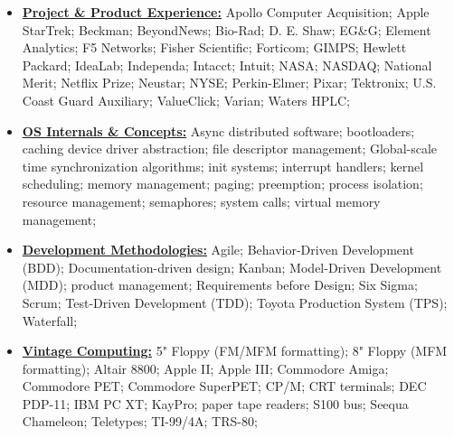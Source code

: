 \documentclass[letterpaper,11pt]{article}
\begin{document}
\begin{multicols}{3}
{\begin{itemize}[leftmargin=0.1in, label={}, itemsep=0pt, parsep=0pt, topsep=0pt, partopsep=0pt]
\item
    \textbf{\uline{Project \& Product Experience:}} \hspace{0pt}
    Apollo Computer Acquisition;
    Apple StarTrek;
    Beckman;
    BeyondNews;
    Bio-Rad;
    D. E. Shaw;
    EG\&G;
    Element Analytics;
    F5 Networks;
    Fisher Scientific;
    Forticom;
    GIMPS;
    Hewlett Packard;
    IdeaLab;
    Independa;
    Intacct;
    Intuit;
    NASA;
    NASDAQ;
    National Merit;
    Netflix Prize;
    Neustar;
    NYSE;
    Perkin-Elmer;
    Pixar;
    Tektronix;
    U.S. Coast Guard Auxiliary;
    ValueClick;
    Varian;
    Waters HPLC;

\item
    \textbf{\uline{OS Internals \& Concepts:}} \hspace{0pt}
    Async distributed software;
    bootloaders;
    caching
    device driver abstraction;
    file descriptor management;
    Global-scale time synchronization algorithms;
    init systems;
    interrupt handlers;
    kernel scheduling;
    memory management;
    paging;
    preemption;
    process isolation;
    resource management;
    semaphores;
    system calls;
    virtual memory management;

\item
    \textbf{\uline{Development Methodologies:}} \hspace{0pt}
    Agile;
    Behavior-Driven Development (BDD);
    Documentation-driven design;
    Kanban;
    Model-Driven Development (MDD);
    product management;
    Requirements before Design;
    Six Sigma;
    Scrum;
    Test-Driven Development (TDD);
    Toyota Production System (TPS);
    Waterfall;

\item
    \textbf{\uline{Vintage Computing:}} \hspace{0pt}
    5" Floppy (FM/MFM formatting);
    8" Floppy (MFM formatting);
    Altair 8800;
    Apple II;
    Apple III;
    Commodore Amiga;
    Commodore PET;
    Commodore SuperPET;
    CP/M;
    CRT terminals;
    DEC PDP-11;
    IBM PC XT;
    KayPro;
    paper tape readers;
    S100 bus;
    Seequa Chameleon;
    Teletypes;
    TI-99/4A;
    TRS-80;


\end{itemize}}
\end{multicols}
\end{document}
